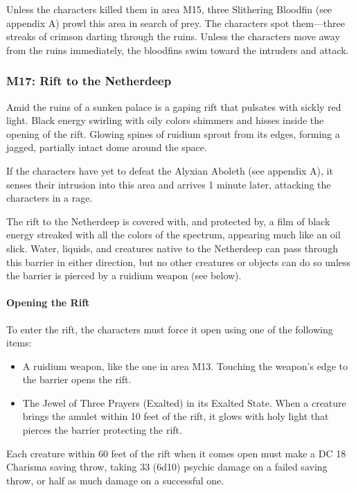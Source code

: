 \documentclass[10pt,a4paper,twoside,bg=print,twocolumn,openany,nodeprecatedcode]{dndbook}
\begin{document}
Unless the characters killed them in area M15, three Slithering Bloodfin (see appendix A) prowl this area in search of prey. The characters spot them—three streaks of crimson darting through the ruins. Unless the characters move away from the ruins immediately, the bloodfins swim toward the intruders and attack.

\subsubsection{M17: Rift to the Netherdeep}
\begin{DndReadAloud}{}
Amid the ruins of a sunken palace is a gaping rift that pulsates with sickly red light. Black energy swirling with oily colors shimmers and hisses inside the opening of the rift. Glowing spines of ruidium sprout from its edges, forming a jagged, partially intact dome around the space.

\end{DndReadAloud}

If the characters have yet to defeat the Alyxian Aboleth (see appendix A), it senses their intrusion into this area and arrives 1 minute later, attacking the characters in a rage.

The rift to the Netherdeep is covered with, and protected by, a film of black energy streaked with all the colors of the spectrum, appearing much like an oil slick. Water, liquids, and creatures native to the Netherdeep can pass through this barrier in either direction, but no other creatures or objects can do so unless the barrier is pierced by a ruidium weapon (see below).

\paragraph{Opening the Rift}
To enter the rift, the characters must force it open using one of the following items:


\begin{itemize}
\item A ruidium weapon, like the one in area M13. Touching the weapon's edge to the barrier opens the rift.
\item The Jewel of Three Prayers (Exalted) in its Exalted State. When a creature brings the amulet within 10 feet of the rift, it glows with holy light that pierces the barrier protecting the rift.
\end{itemize}

Each creature within 60 feet of the rift when it comes open must make a DC 18 Charisma saving throw, taking 33 (6d10) psychic damage on a failed saving throw, or half as much damage on a successful one.
\end{document}
